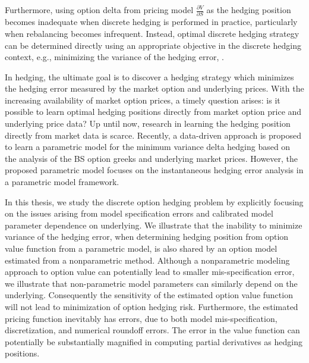 \documentclass[letterpaper,12pt,titlepage,oneside,final]{book}
\numberwithin{equation}{section}
\theoremstyle{definition}
\begin{document}
Furthermore, using option delta from pricing model $\frac{\partial V}{\partial S}$ as the hedging position becomes inadequate when discrete hedging is performed in practice, particularly when rebalancing becomes infrequent.  Instead, optimal discrete hedging strategy can be determined directly using an appropriate objective in the discrete hedging context, e.g., minimizing the variance of the hedging error, \citep{hulloptimal,Angelini10,Goutte13}.

In hedging, the ultimate goal is to discover a hedging strategy  which minimizes the hedging error  measured by the market option and underlying prices. With the increasing availability of market option prices, a timely question arises: is it possible to learn optimal hedging positions directly from market option price and underlying price data?
Up until now, research in learning the hedging position  directly from market data is scarce.
Recently, a data-driven approach  \citep{hulloptimal} is proposed to learn a parametric model for the minimum variance delta hedging based on the analysis of the BS option greeks and underlying market prices. However, the proposed parametric model focuses on the instantaneous hedging error analysis in a parametric model framework.


In this thesis, we study the discrete option hedging problem by  explicitly focusing on the issues arising from  model specification errors and calibrated model parameter dependence on underlying.
We illustrate that the inability to minimize variance of the hedging error, when determining hedging position from option value function from a parametric model, is also shared by an option model estimated from a nonparametric method. Although a nonparametric modeling approach to option value can potentially lead to smaller mis-specification error, we illustrate that non-parametric model parameters can similarly depend on the underlying. Consequently the sensitivity of the estimated option value function will not lead to minimization of option hedging risk.
Furthermore,  the estimated pricing function inevitably has errors, due to both model mis-specification, discretization, and numerical roundoff errors.
The error in the value function can potentially be substantially magnified in computing partial derivatives as hedging positions.
\end{document}
